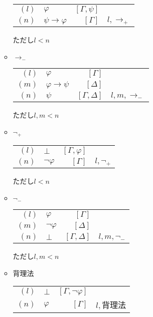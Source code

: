 \documentclass[10pt,b5paper,papersize,dvipdfmx]{jsbook}
\begin{document}
\begin{itemize}
\begin{itemize}
\begin{table}[H]
\begin{center}
\begin{tabular}{rlrl}
$(l)$&$\varphi$&$[\Gamma,\psi]$& \\
$(n)$&$\psi \to \varphi$&$[\Gamma]$&$l,\to_+$ \\
\end{tabular}
\end{center}
\end{table}
ただし$l<n$
\item $\to_-$
\begin{table}[H]
\begin{center}
\begin{tabular}{rlrl}
$(l)$&$\varphi$&$[\Gamma]$& \\
$(m)$&$\varphi \to \psi$&$[\Delta]$& \\
$(n)$&$\psi$&$[\Gamma,\Delta]$&$l,m,\to_-$
\end{tabular}
\end{center}
\end{table}
ただし$l,m<n$
\item $\lnot_+$
\begin{table}[H]
\begin{center}
\begin{tabular}{rlrl}
$(l)$&$\bot$&$[\Gamma,\varphi]$& \\
$(n)$&$\lnot \varphi$&$[\Gamma]$&$l,\lnot_+$
\end{tabular}
\end{center}
\end{table}
ただし$l<n$
\item $\lnot_-$
\begin{table}[H]
\begin{center}
\begin{tabular}{rlrl}
$(l)$&$\varphi$&$[\Gamma]$& \\
$(m)$&$\lnot \varphi$&$[\Delta]$& \\
$(n)$&$\bot$&$[\Gamma,\Delta]$&$l,m,\lnot_-$
\end{tabular}
\end{center}
\end{table}
ただし$l,m<n$
\item 背理法
\begin{table}[H]
\begin{center}
\begin{tabular}{rlrl}
$(l)$&$\bot$&$[\Gamma,\lnot \varphi]$& \\
$(n)$&$\varphi$&$[\Gamma]$&$l,$背理法
\end{tabular}

\end{center}
\end{table}
\end{itemize}
\end{itemize}
\end{document}
